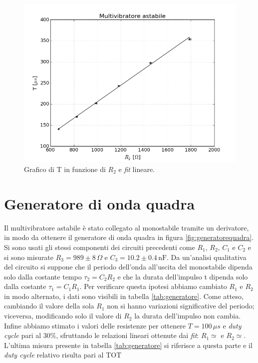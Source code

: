 \documentclass[10pt,a4paper]{article}
\begin{document}
\begin{figure}[!htb]
  \centering
  \includegraphics[scale=0.5]{fitastabile.png}
\caption{Grafico di T in funzione di $R_2$ e \emph{fit} lineare.\label{fit:astabile}}
\end{figure}

\section{Generatore di onda quadra}
Il multivibratore astabile è stato collegato al monostabile tramite un derivatore, in modo da ottenere il generatore di onda quadra in figura \ref{fig:generatorequadra}. Si sono usati gli stessi componenti dei circuiti precedenti come $R_1$, $R_2$, $C_1$ e $C_2$ e si sono misurate $R_3=989\pm8\,\Omega$ e $C_3= 10.2\pm0.4 \,\text{nF}$. Da un'analisi qualitativa del circuito si suppone che il periodo dell'onda all'uscita del monostabile dipenda solo dalla costante tempo $\tau_2=C_2R_2$ e che la durata dell'impulso t dipenda solo dalla costante $\tau_1=C_1R_1$. Per verificare questa ipotesi abbiamo cambiato $R_1$ e $R_2$ in modo alternato, i dati sono visibili in tabella \ref{tab:generatore}. Come atteso, cambiando il valore della sola $R_1$ non si hanno variazioni significative del periodo; viceversa, modificando solo il valore di $R_2$ la durata dell'impulso non cambia.
Infine abbiamo stimato i valori delle resistenze per ottenere $T=100\,\mu s$ e \emph{duty cycle} pari al $30\%$, sfruttando le relazioni lineari ottenute dai \emph{fit}: $R_1\simeq $ e $R_2 \simeq $. L'ultima misura presente in tabella \ref{tab:generatore} si riferisce a questa parte e il \emph{duty cycle} relativo risulta pari al TOT
\end{document}
